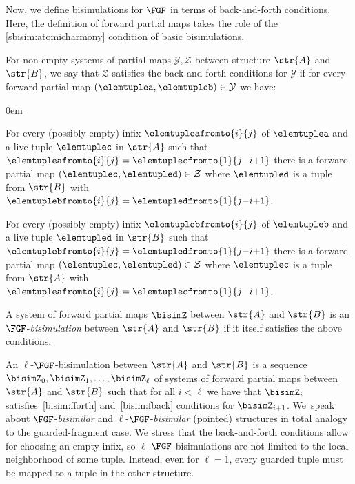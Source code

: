Now, we define bisimulations for $\FGF$ in terms of back-and-forth conditions.
Here, the definition of forward partial maps takes the role of the \ref{sbisim:atomicharmony} condition of basic bisimulations.
\begin{definition}
  For non-empty systems of partial maps $\mathcal{Y}, \mathcal{Z}$ between structure $\str{A}$ and $\str{B}$, we say that $\mathcal{Z}$ satisfies the back-and-forth conditions for $\mathcal{Y}$ if for every forward partial map $(\elemtuplea, \elemtupleb) \in \mathcal{Y}$ we have:
  \begin{description}\itemsep0em
    \item[\desclabel{(fForth)}{bisim:fforth}] For every (possibly empty) infix $\elemtupleafromto{i}{j}$ of $\elemtuplea$ and a live tuple $\elemtuplec$ in $\str{A}$ such that $\elemtupleafromto{i}{j} = \elemtuplecfromto{1}{j{-}i{+}1}$ there is a forward partial map $(\elemtuplec, \elemtupled) \in \mathcal{Z}$ where $\elemtupled$ is a tuple from $\str{B}$ with $\elemtuplebfromto{i}{j} = \elemtupledfromto{1}{j{-}i{+}1}$.
    \item[\desclabel{(fBack)}{bisim:fback}] For every (possibly empty) infix $\elemtuplebfromto{i}{j}$ of $\elemtupleb$ and a live tuple $\elemtupled$ in $\str{B}$ such that $\elemtuplebfromto{i}{j} = \elemtupledfromto{1}{j{-}i{+}1}$ there is a forward partial map $(\elemtuplec, \elemtupled) \in \mathcal{Z}$ where $\elemtuplec$ is a tuple from $\str{A}$ with $\elemtupleafromto{i}{j} = \elemtuplecfromto{1}{j{-}i{+}1}$.
  \end{description}
  A system of forward partial maps $\bisimZ$ between $\str{A}$ and $\str{B}$ is an $\FGF$-\emph{bisimulation} between $\str{A}$ and $\str{B}$ if it itself satisfies the above conditions.
\end{definition}
An $\ell$-$\FGF$-bisimulation between $\str{A}$ and $\str{B}$ is a sequence $\bisimZ_0, \bisimZ_1, \ldots, \bisimZ_\ell$ of systems of forward partial maps between $\str{A}$ and $\str{B}$ such that for all $i < \ell$ we have that $\bisimZ_i$ satisfies~\ref{bisim:fforth} and~\ref{bisim:fback} conditions for $\bisimZ_{i{+}1}$.
We~speak about $\FGF$-\emph{bisimilar} and $\ell$-$\FGF$-\emph{bisimilar} (pointed) structures in total analogy to the guarded-fragment case.
We stress that the back-and-forth conditions allow for choosing an empty infix, so $\ell$-$\FGF$-bisimulations are not limited to the local neighborhood of some tuple.
Instead, even for $\ell = 1$, every guarded tuple must be mapped to a tuple in the other structure.

